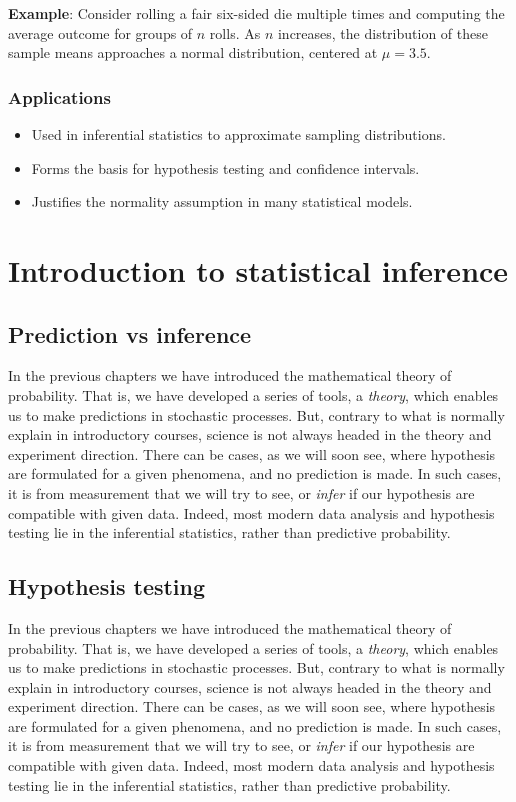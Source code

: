 \documentclass{book}
\begin{document}
\textbf{Example}: Consider rolling a fair six-sided die multiple times and computing the average outcome for groups of $n$ rolls. As $n$ increases, the distribution of these sample means approaches a normal distribution, centered at $\mu=3.5$.

\subsection{Applications}
\begin{itemize}
    \item Used in inferential statistics to approximate sampling distributions.
    \item Forms the basis for hypothesis testing and confidence intervals.
    \item Justifies the normality assumption in many statistical models.
\end{itemize}

\chapter{Introduction to statistical inference}

\section{Prediction vs inference}
In the previous chapters we have introduced the mathematical theory of probability. That is, we have developed a series of tools, a \textit{theory}, which enables us to make predictions in stochastic processes. But, contrary to what is normally explain in introductory courses, science is not always headed in the theory and experiment direction. There can be cases, as we will soon see, where hypothesis are formulated for a given phenomena, and no prediction is made. In such cases, it is from measurement that we will try to see, or \textit{infer} if our hypothesis are compatible with given data. Indeed, most modern data analysis and hypothesis testing lie in the inferential statistics, rather than predictive probability.

\section{Hypothesis testing}
In the previous chapters we have introduced the mathematical theory of probability. That is, we have developed a series of tools, a \textit{theory}, which enables us to make predictions in stochastic processes. But, contrary to what is normally explain in introductory courses, science is not always headed in the theory and experiment direction. There can be cases, as we will soon see, where hypothesis are formulated for a given phenomena, and no prediction is made. In such cases, it is from measurement that we will try to see, or \textit{infer} if our hypothesis are compatible with given data. Indeed, most modern data analysis and hypothesis testing lie in the inferential statistics, rather than predictive probability.\\
\end{document}
